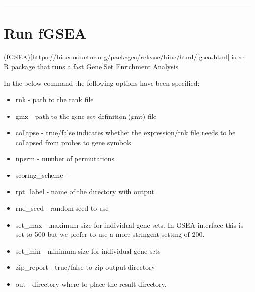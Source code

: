 \documentclass[
]{book}
\providecommand{\tightlist}{%
  \setlength{\itemsep}{0pt}\setlength{\parskip}{0pt}}
\begin{document}
\begin{center}\rule{0.5\linewidth}{0.5pt}\end{center}

\section{Run fGSEA}\label{run-fgsea}

(fGSEA){[}\url{https://bioconductor.org/packages/release/bioc/html/fgsea.html}{]} is an R package that runs a fast Gene Set Enrichment Analysis.

In the below command the following options have been specified:

\begin{itemize}
\tightlist
\item
  rnk - path to the rank file
\item
  gmx - path to the gene set definition (gmt) file
\item
  collapse - true/false indicates whether the expression/rnk file needs to be collapsed from probes to gene symbols
\item
  nperm - number of permutations
\item
  scoring\_scheme -
\item
  rpt\_label - name of the directory with output
\item
  rnd\_seed - random seed to use
\item
  set\_max - maximum size for individual gene sets. In GSEA interface this is set to 500 but we prefer to use a more stringent setting of 200.
\item
  set\_min - minimum size for individual gene sets
\item
  zip\_report - true/false to zip output directory
\item
  out - directory where to place the result directory.
\end{itemize}
\end{document}
